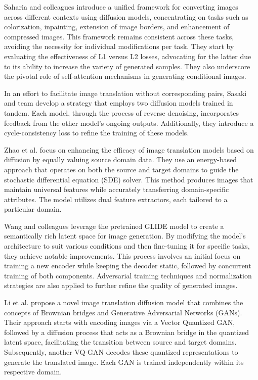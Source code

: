 Saharia and colleagues \cite{Saharia2022Palette} introduce a unified framework for converting images across different contexts using diffusion models, concentrating on tasks such as colorization, inpainting, extension of image borders, and enhancement of compressed images. This framework remains consistent across these tasks, avoiding the necessity for individual modifications per task. They start by evaluating the effectiveness of L1 versus L2 losses, advocating for the latter due to its ability to increase the variety of generated samples. They also underscore the pivotal role of self-attention mechanisms in generating conditional images.

In an effort to facilitate image translation without corresponding pairs, Sasaki and team \cite{Sasaki2021UNITDDPM} develop a strategy that employs two diffusion models trained in tandem. Each model, through the process of reverse denoising, incorporates feedback from the other model's ongoing outputs. Additionally, they introduce a cycle-consistency loss to refine the training of these models.

Zhao et al. \cite{Zhao2022EGSDE} focus on enhancing the efficacy of image translation models based on diffusion by equally valuing source domain data. They use an energy-based approach that operates on both the source and target domains to guide the stochastic differential equation (SDE) solver. This method produces images that maintain universal features while accurately transferring domain-specific attributes. The model utilizes dual feature extractors, each tailored to a particular domain.

Wang and colleagues \cite{Wang2022Pretraining} leverage the pretrained GLIDE model to create a semantically rich latent space for image generation. By modifying the model's architecture to suit various conditions and then fine-tuning it for specific tasks, they achieve notable improvements. This process involves an initial focus on training a new encoder while keeping the decoder static, followed by concurrent training of both components. Adversarial training techniques and normalization strategies are also applied to further refine the quality of generated images.

Li et al. \cite{Li2022VQBB} propose a novel image translation diffusion model that combines the concepts of Brownian bridges and Generative Adversarial Networks (GANs). Their approach starts with encoding images via a Vector Quantized GAN, followed by a diffusion process that acts as a Brownian bridge in the quantized latent space, facilitating the transition between source and target domains. Subsequently, another VQ-GAN decodes these quantized representations to generate the translated image. Each GAN is trained independently within its respective domain.

